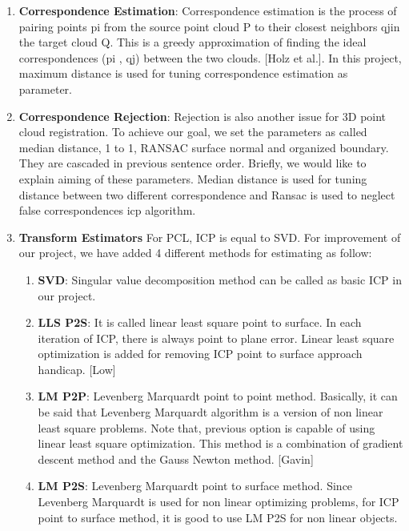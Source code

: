 \documentclass[aps,letterpaper,11pt]{revtex4}
\begin{document}
\begin{enumerate}
\item \textbf{Correspondence Estimation}: Correspondence estimation is the process of pairing points pi from the source point cloud P to their closest neighbors qjin the target cloud Q. This is a greedy approximation of finding the ideal correspondences (pi , qj) between the two clouds. [Holz et al.]. In this project, maximum distance is used for tuning correspondence estimation as parameter.
\item \textbf{Correspondence Rejection}: Rejection is also another issue for 3D point cloud registration. To achieve our goal, we set the parameters as called median distance, 1 to 1, RANSAC surface normal and organized boundary. They are cascaded in previous sentence order. Briefly, we would like to explain aiming of these parameters. Median distance is used for tuning distance between two different correspondence and Ransac is used to neglect false correspondences icp algorithm.
\item \textbf{Transform Estimators}
For PCL, ICP is equal to SVD. For improvement of our project, we have added 4 different methods  for estimating as follow:
\begin{enumerate}
 \item \textbf{SVD}: Singular value decomposition method can be called as basic ICP in our project.
\item \textbf{LLS P2S}: It is called linear least square point to surface. In each iteration of ICP, there is always point to plane error. Linear least square optimization is added for removing ICP point to surface approach handicap. [Low]
 \item \textbf{LM P2P}:  Levenberg Marquardt point to point method. Basically, it can be said that Levenberg Marquardt algorithm is a version of non linear least square problems. Note that, previous option is capable of using linear least square optimization. This method is a combination of gradient descent method and the Gauss Newton method. [Gavin]
 \item \textbf{LM P2S}: Levenberg Marquardt point to  surface method. Since Levenberg Marquardt is used for non linear optimizing problems,  for ICP point to surface method, it is good to use LM P2S for non linear objects.

\end{enumerate}




\end{enumerate}
\end{document}
